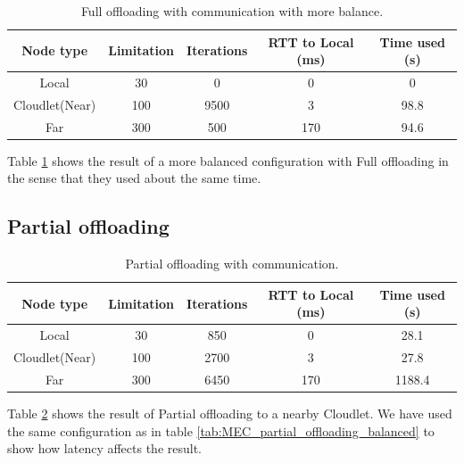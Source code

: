 \begin{table}[h!]
    \centering
    \begin{tabular}[c]{|c|c|c|c|c|}
        \hline
        Node type & Limitation & Iterations & RTT to Local (ms)& Time used (s)\\
        \hline
        \hline
        Local           & 30 & 0 & 0 & 0  \\
        \hline
        Cloudlet(Near)  & 100 & 9500 & 3 & 98.8 \\
        \hline
        Far             & 300 & 500 & 170 & 94.6 \\
        \hline
    \end{tabular}
    \caption{Full offloading with communication with more balance.}
    \label{tab:Cloudlet_full_offloading_latency_balanced}
\end{table}
Table \ref{tab:Cloudlet_full_offloading_latency_balanced} shows the result of a more balanced configuration with Full offloading in the sense that they used about the same time.




\subsection{Partial offloading}
\begin{table}[h!]
    \centering
    \begin{tabular}[c]{|c|c|c|c|c|}
        \hline
        Node type & Limitation & Iterations & RTT to Local (ms)& Time used (s)\\
        \hline
        \hline
        Local           & 30 & 850 & 0 & 28.1  \\
        \hline
        Cloudlet(Near)  & 100 & 2700 & 3 & 27.8 \\
        \hline
        Far             & 300 & 6450 & 170 & 1188.4 \\
        \hline
    \end{tabular}
    \caption{Partial offloading with communication.}
    \label{tab:Cloudlet_partial_offloading_latency}
\end{table}
Table \ref{tab:Cloudlet_partial_offloading_latency} shows the result of Partial offloading to a nearby Cloudlet. We have used the same configuration as in table \ref{tab:MEC_partial_offloading_balanced} to show how latency affects the result. 





